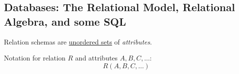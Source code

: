 \subsection{Databases: The Relational Model, Relational Algebra, and some SQL}%
\label{sub:relational-algebra}

\begin{multicols}{2}






    \begin{CheatsheetEntryFrameNew}


        Relation schemas are \ul{unordered sets} of \textit{attributes}.

        Notation for relation $R$ and attributes $A, B, C, \dots$:
        \begin{equation*}
            R(A, B, C, \dots)
        \end{equation*}


\end{CheatsheetEntryFrameNew}
\end{multicols}
